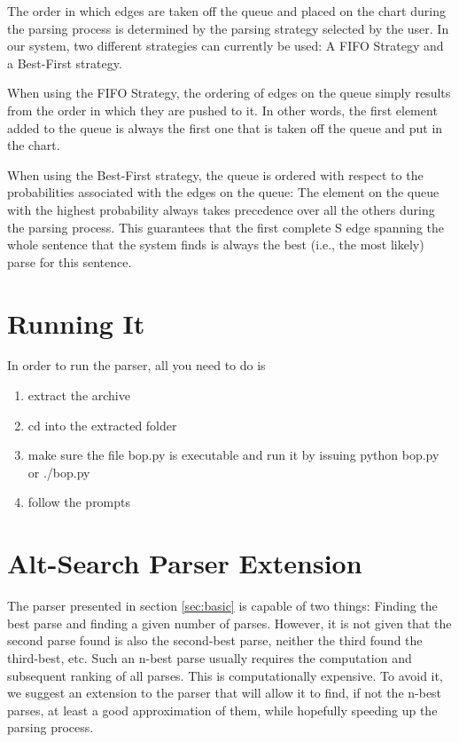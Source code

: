 \documentclass[11pt, titlepage, a4paper]{scrartcl}		%
\newcommand{\XMas}[1]{Alt-Search#1}
\begin{document}
The order in which edges are taken off the queue and placed on the chart during the parsing process is determined by the parsing strategy selected by the user. In our system, two different strategies can currently be used: A FIFO Strategy and a Best-First strategy.

When using the FIFO Strategy, the ordering of edges on the queue simply results from the order in which they are pushed to it. In other words, the first element added to the queue is always the first one that is taken off the queue and put in the chart.

When using the Best-First strategy, the queue is ordered with respect to the probabilities associated with the edges on the queue: The element on the queue with the highest probability always takes precedence over all the others during the parsing process. This guarantees that the first complete S edge spanning the whole sentence that the system finds is always the best (i.e., the most likely) parse for this sentence.


\section{Running It}
\label{sec:howto}
In order to run the parser, all you need to do is

\begin{enumerate}
\item
extract the archive
\item
cd into the extracted folder
\item
make sure the file bop.py is executable and run it by issuing python bop.py or ./bop.py
\item
follow the prompts
\end{enumerate}


\section{\XMas{} Parser Extension}
\label{sec:alt}
The parser presented in section \ref{sec:basic} is capable of two things: Finding the best parse and finding a given number of parses. However, it is not given that the second parse found is also the second-best parse, neither the third found the third-best, etc. Such an n-best parse usually requires the computation and subsequent ranking of all parses.
This is computationally expensive. To avoid it, we suggest an extension to the parser that will allow it to find, if not the n-best parses, at least a good approximation of them, while hopefully speeding up the parsing process.
\end{document}
